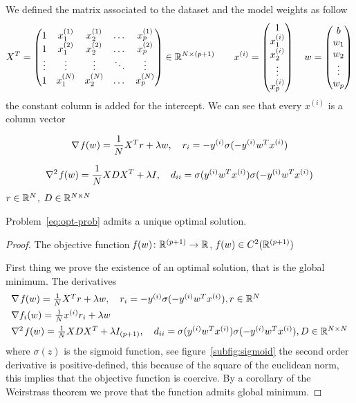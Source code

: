We defined the matrix associated to the dataset and the model weights as follow
\[
X^T=
\begin{pmatrix}
1 & x_1^{(1)} & x_2^{(1)} & \dots & x_p^{(1)} \\
1 & x_1^{(2)} & x_2^{(2)} & \dots & x_p^{(2)} \\
\vdots & \vdots & \vdots & \ddots & \vdots \\
1 & x_1^{(N)} & x_2^{(N)} & \dots & x_p^{(N)}
\end{pmatrix}\in\mathbb{R}^{N\times(p+1)}\qquad
x^{(i)}=
\begin{pmatrix}
1 \\ x_1^{(i)} \\ x_2^{(i)} \\ \vdots \\ x_p^{(i)}
\end{pmatrix}\quad
w=
\begin{pmatrix}
b \\ w_1 \\ w_2 \\ \vdots \\ w_p
\end{pmatrix}
\]
the constant column is added for the intercept. We can see that every $x^{(i)}$ is a column vector

\[
\nabla\operatorname*{\mathit{f}}(w)=\frac{1}{N}X^Tr+\lambda w,\quad r_i=-y^{(i)}\sigma(-y^{(i)}w^Tx^{(i)})
\]

\[
\nabla^2\operatorname*{\mathit{f}}(w)=\frac{1}{N}XDX^T+\lambda I,\quad d_{ii}=\sigma(y^{(i)}w^Tx^{(i)})\sigma(-y^{(i)}w^Tx^{(i)})
\]
$r\in\mathbb{R}^N$, $D\in\mathbb{R}^{N\times N}$

\begin{prop}
Problem~\eqref{eq:opt-prob} admits a unique optimal solution.
\end{prop}

\begin{proof}
The objective function $\operatorname*{\mathit{f}}(w)\colon\mathbb{R}^{(p+1)}\to\mathbb{R}$, $\operatorname*{\mathit{f}}(w)\in C^2(\mathbb{R}^{(p+1)})$

First thing we prove the existence of an optimal solution, that is the global minimum. The derivatives
\[
\begin{array}{@{}l@{}}
\nabla\func(w)=\frac{1}{N}X^Tr+\lambda w,\quad r_i=-y^{(i)}\sigma(-y^{(i)}w^Tx^{(i)}),r\in\R^N \\[1ex]
\nabla f_i(w)=\frac{1}{N}x^{(i)}r_i+\lambda w \\[1ex]
\nabla^2\func(w)=\frac{1}{N}XDX^T+\lambda I_{(p+1)},\quad d_{ii}=\sigma(y^{(i)}w^Tx^{(i)})\sigma(-y^{(i)}w^Tx^{(i)}),D\in\R^{N\times N}
\end{array}
\]
where $\sigma(z)$ is the sigmoid function, see figure~\vref{subfig:sigmoid}
the second order derivative is positive-defined, this because of the square of the euclidean norm, this implies that the objective function is coercive. By a corollary of the Weirstrass theorem we prove that the function admits global minimum.


\end{proof}



